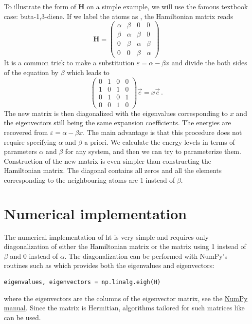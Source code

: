 To illustrate the form of $\mathbf{H}$ on a simple example, we will use the famous textbook case: buta-1,3-diene. If we label the atoms as , the Hamiltonian matrix reads
\begin{equation}
\mathbf{H} = 
\begin{pmatrix}
\alpha & \beta & 0 & 0  \\
\beta &\alpha & \beta & 0  \\
0 &\beta &\alpha & \beta  \\
0 & 0 & \beta &\alpha  
\end{pmatrix}
\label{eq:huckel8}
\end{equation}
It is a common trick to make a substitution $\varepsilon = \alpha - \beta x$ and divide the both sides of the equation by $\beta$ which leads to
\begin{equation}
\begin{pmatrix}
0 & 1 & 0 & 0  \\
1 & 0 & 1 & 0  \\
0 & 1 & 0 & 1  \\
0 & 0 & 1 & 0  
\end{pmatrix}\Vec{c}=x\Vec{c}\, .
\label{eq:huckel9}
\end{equation}
The new matrix is then diagonalized with the eigenvalues corresponding to $x$ and the eigenvectors still being the same expansion coefficients. The energies are recovered from $\varepsilon = \alpha - \beta x$. The main advantage is that this procedure does not require specifying $\alpha$ and $\beta$ a priori. We calculate the energy levels in terms of parameters $\alpha$ and $\beta$ for any system, and then we can try to parameterize them. 
Construction of the new matrix is even simpler than constructing the Hamiltonian matrix. The diagonal contains all zeros and all the elements corresponding to the neighbouring atoms are 1 instead of $\beta$.

\section{Numerical implementation}

The numerical implementation of \acrlong{ht} is very simple and requires only diagonalization of either the Hamiltonian matrix or the matrix using 1 instead of $\beta$ and 0 instead of $\alpha$. The diagonalization can be performed with NumPy's routines such as  which provides both the eigenvalues and eigenvectors:
\begin{lstlisting}[language=Python, style=mystyle2]
eigenvalues, eigenvectors = np.linalg.eigh(H)
\end{lstlisting}
where the eigenvectors are the columns of the eigenvector matrix, see the \href{https://numpy.org/doc/2.1/reference/generated/numpy.linalg.eig.html}{NumPy manual}. Since the matrix is Hermitian, algorithms tailored for such matrices like  can be used.

